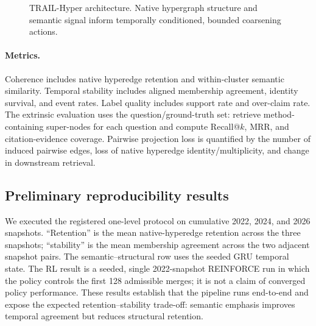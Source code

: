 \documentclass[11pt]{article}
\begin{document}
\begin{figure}[t]
\centering
{}
\caption{TRAIL-Hyper architecture. Native hypergraph structure and semantic signal inform temporally conditioned, bounded coarsening actions.}
\label{fig:architecture}
\end{figure}

\paragraph{Metrics.} Coherence includes native hyperedge retention and within-cluster semantic similarity. Temporal stability includes aligned membership agreement, identity survival, and event rates. Label quality includes support rate and over-claim rate. The extrinsic evaluation uses the question/ground-truth set: retrieve method-containing super-nodes for each question and compute Recall@$k$, MRR, and citation-evidence coverage. Pairwise projection loss is quantified by the number of induced pairwise edges, loss of native hyperedge identity/multiplicity, and change in downstream retrieval.

\subsection{Preliminary reproducibility results}
We executed the registered one-level protocol on cumulative 2022, 2024, and 2026 snapshots. ``Retention'' is the mean native-hyperedge retention across the three snapshots; ``stability'' is the mean membership agreement across the two adjacent snapshot pairs. The semantic--structural row uses the seeded GRU temporal state. The RL result is a seeded, single 2022-snapshot REINFORCE run in which the policy controls the first 128 admissible merges; it is not a claim of converged policy performance. These results establish that the pipeline runs end-to-end and expose the expected retention--stability trade-off: semantic emphasis improves temporal agreement but reduces structural retention.
\end{document}
